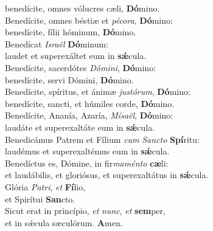 \oddverse benedícite, omnes vólucres cæli, \textbf{Dó}mino.\\
\evenverse Benedícite, omnes béstiæ et \textit{pé}\textit{co}\textit{ra}, \textbf{Dó}mino:~\*\\
\evenverse benedícite, fílii hóminum, \textbf{Dó}mino.\\
\oddverse Benedícat \textit{Is}\textit{ra}\textit{ël} \textbf{Dó}minum:~\*\\
\oddverse laudet et superexáltet eum in \textbf{sǽ}cula.\\
\evenverse Benedícite, sacerdótes \textit{Dó}\textit{mi}\textit{ni}, \textbf{Dó}mino:~\*\\
\evenverse benedícite, servi Dómini, \textbf{Dó}mino.\\
\oddverse Benedícite, spíritus, et ánimæ \textit{ju}\textit{stó}\textit{rum}, \textbf{Dó}mino:~\*\\
\oddverse benedícite, sancti, et húmiles corde, \textbf{Dó}mino.\\
\evenverse Benedícite, Ananía, Azaría, \textit{Mí}\textit{sa}\textit{ël}, \textbf{Dó}mino:~\*\\
\evenverse laudáte et superexaltáte eum in \textbf{sǽ}cula.\\
\oddverse Benedicámus Patrem et Fílium \textit{cum} \textit{San}\textit{cto} \textbf{Spí}ritu:~\*\\
\oddverse laudémus et superexaltémus eum in \textbf{sǽ}cula.\\
\evenverse Benedíctus es, Dómine, in fir\textit{ma}\textit{mén}\textit{to} \textbf{cæ}li:~\*\\
\evenverse et laudábilis, et gloriósus, et superexaltátus in \textbf{sǽ}cula.\\
\oddverse Glória \textit{Pa}\textit{tri}, \textit{et} \textbf{Fí}lio,~\*\\
\oddverse et Spirítui \textbf{San}cto.\\
\evenverse Sicut erat in princípio, \textit{et} \textit{nunc}, \textit{et} \textbf{sem}per,~\*\\
\evenverse et in sǽcula sæculórum. \textbf{A}men.\\
